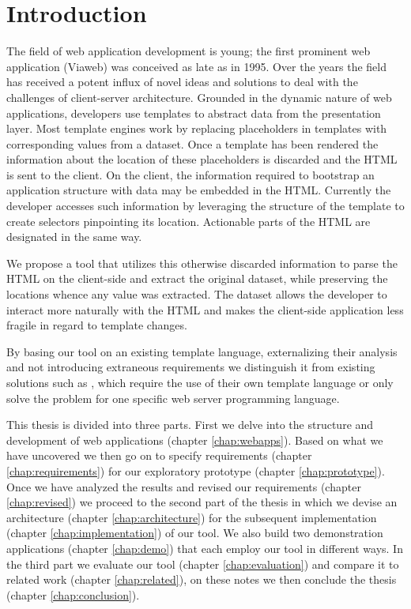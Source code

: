 \documentclass[thesis.tex]{subfiles}
\begin{document}
\chapter{Introduction}
\label{chap:intro}
The field of web application development is young; the first prominent
web application (Viaweb) was conceived as late as in 1995.
Over the years the field has received a potent influx of novel ideas and
solutions to deal with the challenges of client-server architecture.
Grounded in the dynamic nature of web applications, developers use templates to
abstract data from the presentation layer.
Most template engines work by replacing placeholders in templates with
corresponding values from a dataset.
Once a template has been rendered the information about the location of these
placeholders is discarded and the HTML is sent to the client.
On the client, the information required to bootstrap an application structure
with data may be embedded in the HTML. Currently the developer accesses such
information by leveraging the structure of the template to create selectors
pinpointing its location. Actionable parts of the HTML are designated in the
same way.

We propose a tool that utilizes this otherwise discarded information to parse
the HTML on the client-side and extract the original dataset, while preserving
the locations whence any value was extracted. The dataset allows the developer
to interact more naturally with the HTML and makes the client-side application
less fragile in regard to template changes.

By basing our tool on an existing template language, externalizing their
analysis and not introducing extraneous requirements we distinguish it from
existing solutions such as \todo{},
which require the use of their own template language or only solve the problem
for one specific web server programming language.


This thesis is divided into three parts. First we delve into the structure
and development of web applications (chapter \ref{chap:webapps}).
Based on what we have uncovered we then go on to specify
requirements (chapter \ref{chap:requirements}) for our
exploratory prototype (chapter \ref{chap:prototype}).
Once we have analyzed the results and revised our
requirements (chapter \ref{chap:revised}) we proceed to the second part of the
thesis in which we devise an architecture (chapter \ref{chap:architecture}) for
the subsequent implementation (chapter \ref{chap:implementation}) of our tool.
We also build two demonstration applications (chapter \ref{chap:demo}) that each
employ our tool in different ways.
In the third part we evaluate our tool (chapter \ref{chap:evaluation}) and
compare it to related work (chapter \ref{chap:related}), on these notes we then
conclude the thesis (chapter \ref{chap:conclusion}).
\end{document}
